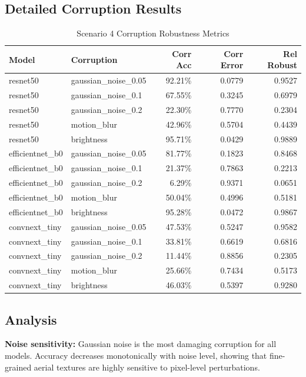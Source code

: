 \documentclass[12pt,a4paper]{article}
\begin{document}
\subsection{Detailed Corruption Results}
\begin{table}[H]
    \centering
    \caption{Scenario 4 Corruption Robustness Metrics}
    \begin{tabular}{llrrr}
        \toprule
        Model & Corruption & Corr Acc & Corr Error & Rel Robust \\
        \midrule
        resnet50 & gaussian\_noise\_0.05 & 92.21\% & 0.0779 & 0.9527 \\
        resnet50 & gaussian\_noise\_0.1  & 67.55\% & 0.3245 & 0.6979 \\
        resnet50 & gaussian\_noise\_0.2  & 22.30\% & 0.7770 & 0.2304 \\
        resnet50 & motion\_blur          & 42.96\% & 0.5704 & 0.4439 \\
        resnet50 & brightness            & 95.71\% & 0.0429 & 0.9889 \\
        \midrule
        efficientnet\_b0 & gaussian\_noise\_0.05 & 81.77\% & 0.1823 & 0.8468 \\
        efficientnet\_b0 & gaussian\_noise\_0.1  & 21.37\% & 0.7863 & 0.2213 \\
        efficientnet\_b0 & gaussian\_noise\_0.2  & 6.29\%  & 0.9371 & 0.0651 \\
        efficientnet\_b0 & motion\_blur          & 50.04\% & 0.4996 & 0.5181 \\
        efficientnet\_b0 & brightness            & 95.28\% & 0.0472 & 0.9867 \\
        \midrule
        convnext\_tiny & gaussian\_noise\_0.05 & 47.53\% & 0.5247 & 0.9582 \\
        convnext\_tiny & gaussian\_noise\_0.1  & 33.81\% & 0.6619 & 0.6816 \\
        convnext\_tiny & gaussian\_noise\_0.2  & 11.44\% & 0.8856 & 0.2305 \\
        convnext\_tiny & motion\_blur          & 25.66\% & 0.7434 & 0.5173 \\
        convnext\_tiny & brightness            & 46.03\% & 0.5397 & 0.9280 \\
        \bottomrule
    \end{tabular}
\end{table}

\subsection{Analysis}
\textbf{Noise sensitivity:}
Gaussian noise is the most damaging corruption for all models. Accuracy decreases monotonically with noise level, showing that fine-grained aerial textures are highly sensitive to pixel-level perturbations.
\end{document}
